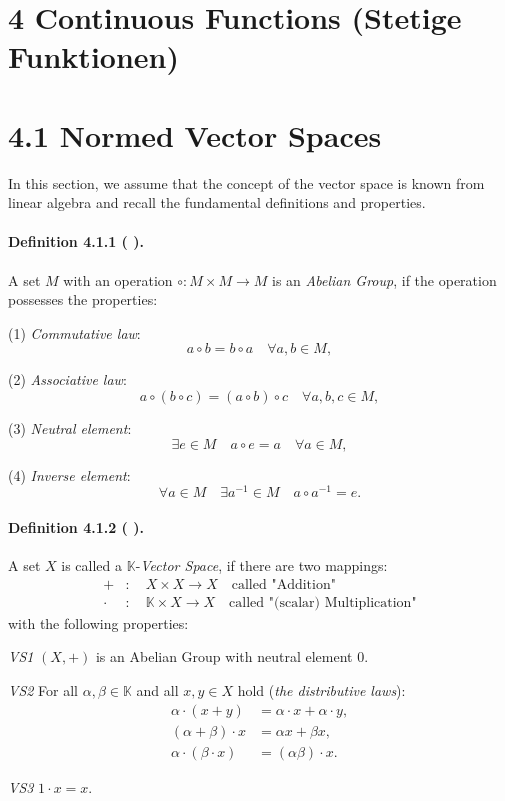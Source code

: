 \documentclass[12pt]{article}
\newcommand{\K}{\mathbb{K}} %
\newcommand{\NumberedDefinition}[3]{%
\paragraph*{Definition #1 ( #2 ).} #3\par}
\begin{document}
	
\section*{4 Continuous Functions (Stetige Funktionen)}

\section*{4.1 Normed Vector Spaces}

In this section, we assume that the concept of the vector space is known from linear algebra and recall the fundamental definitions and properties.

\NumberedDefinition{4.1.1}{}{
A set $M$ with an operation $\circ : M \times M \to M$ is an \textit{Abelian Group}, if the operation possesses the properties:

(1) \textit{Commutative law}:
\[
a \circ b = b \circ a \quad \forall a,b \in M,
\]

(2) \textit{Associative law}:
\[
a \circ (b \circ c) = (a \circ b) \circ c \quad \forall a,b,c \in M,
\]

(3) \textit{Neutral element}:
\[
\exists e \in M \quad a \circ e = a \quad \forall a \in M,
\]

(4) \textit{Inverse element}:
\[
\forall a \in M \quad \exists a^{-1} \in M \quad a \circ a^{-1} = e.
\]
}

\NumberedDefinition{4.1.2}{}{
A set $X$ is called a $\K$-\textit{Vector Space}, if there are two mappings:
\begin{align*}
+ &: \quad X \times X \to X \quad \text{called "Addition"} \\
\cdot &: \quad \K \times X \to X \quad \text{called "(scalar) Multiplication"}
\end{align*}
with the following properties:

\textit{VS1} $(X, +)$ is an Abelian Group with neutral element $0$.

\textit{VS2} For all $\alpha, \beta \in \K$ and all $x, y \in X$ hold (\textit{the distributive laws}):
\begin{align*}
\alpha \cdot (x + y) &= \alpha \cdot x + \alpha \cdot y, \\
(\alpha + \beta) \cdot x &= \alpha x + \beta x, \\
\alpha \cdot (\beta \cdot x) &= (\alpha \beta) \cdot x.
\end{align*}

\textit{VS3} $1 \cdot x = x$.
}
\end{document}
